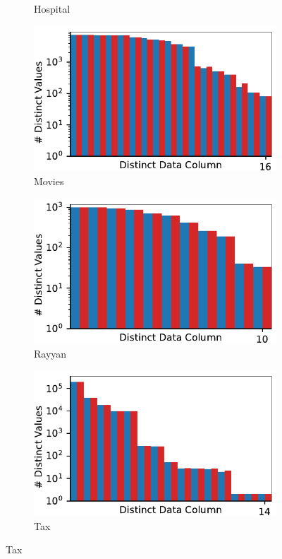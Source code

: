 \begin{figure}[!t]
\begin{subfigure}{0.32\textwidth}
    \caption{Hospital}
    \label{fig:distincts_hospitals}
\end{subfigure}
\hfill
\begin{subfigure}{0.32\textwidth}
    \includegraphics[width=\textwidth]{figures/plot/distinct/movies_distinct/combined.pdf}
    \caption{Movies}
    \label{exp:distincts_movies}
\end{subfigure}
\hfill
\begin{subfigure}{0.32\textwidth}
    \includegraphics[width=\textwidth]{figures/plot/distinct/rayyan_distinct/combined.pdf}
    \caption{Rayyan}
    \label{exp:distincts_rayyan}
\end{subfigure}
\hfill
\begin{subfigure}{0.32\textwidth}
    \includegraphics[width=\textwidth]{figures/plot/distinct/tax_distinct/combined.pdf}
    \caption{Tax}
    \label{exp:distincts_tax}
\end{subfigure}
\hfill
        

\end{figure}
